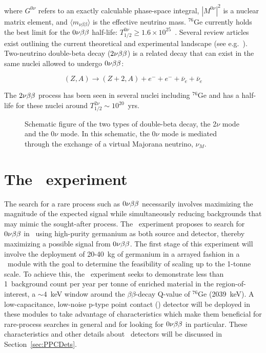 where $G^{0\nu}$ refers to an exactly calculable phase-space integral, 
$|M^{0\nu}|^2$ is a nuclear matrix element, and $\langle m_{\nu{\beta\beta}}\rangle$
is the effective neutrino mass.  $^{76}$Ge currently holds the best limit for
the $\nonubb$ half-life: $T^{0\nu}_{1/2}\geq 1.6\times10^{25}$~\cite{Bau99}.
Several review articles exist outlining the current theoretical and
experimental landscape (see e.g.~\cite{Ell02,Bara07}).  
Two-neutrino double-beta decay ($\twonubb$) is a related 
decay that can exist in the same nuclei allowed to undergo $\nonubb$:  

		\begin{equation}
		(Z,A) \rightarrow (Z+2,A) + e^- + e^- + \bar{\nu}_e + \bar{\nu}_e
		\end{equation}

The $\twonubb$ process has been seen in several nuclei including $^{76}$Ge and has
a half-life for these nuclei around $T^{2\nu}_{1/2}\sim10^{20}$~yrs.  

		\begin{figure}
			\centering
			\def\figheight{0.4\textheight}
		\caption[Schematic of $\twonubb$ and $\nonubb$ decays.]{Schematic figure of the two types of double-beta decay, 
		the 2$\nu$ mode and the 0$\nu$ mode.  
			In this schematic, the 0$\nu$ mode is mediated through the exchange of a virtual Majorana neutrino, $\nu_{M}$.}
		\label{fig:DBDK}
		\end{figure}
 

	
	\section{The \MJ\ experiment}
	\label{sec:MJExperiment}
	
The search for a rare process such as $\nonubb$ necessarily involves maximizing the magnitude of the expected signal while
simultaneously reducing backgrounds that may mimic the sought-after process.  
The \MJ~experiment proposes to search for $\nonubb$ in \gersevensix~using high-purity
germanium as both source and detector, thereby maximizing a possible signal from $\nonubb$. 
The first stage of this experiment will involve the deployment of 20-40~kg of germanium in a arrayed fashion in a \minmod~module with the goal to determine
the feasibility of scaling up to the 1-tonne scale.  To achieve this, the \MJ~experiment seeks to demonstrate less than
1~background count per year per tonne of enriched material in the
region-of-interest, a $\sim4$~keV window around the $\beta\beta$-decay
Q-value of $^{76}$Ge (2039~keV).  A low-capacitance, low-noise p-type point contact (\ppc)
detector will be deployed in these modules to take advantage of characteristics which make 
them beneficial for rare-process searches in general and for looking for $\nonubb$ in particular.  These characteristics and other details about \ppc~detectors will be discussed in Section~\ref{sec:PPCDets}.  

